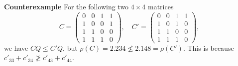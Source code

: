 \documentclass{beamer}
\theoremstyle{plain}
\theoremstyle{definition}
\begin{document}
\begin{frame}{\bf Counterexample}
For the following two $4\times 4$ matrices
$$C=\begin{pmatrix}
0 & 0 & 1 & 1\\
1 & 0 & 0 & 1\\
1 & 1 & 0 & 0\\
1 & 1 & 1 & 0
\end{pmatrix},\quad C'=\begin{pmatrix}
0 & 0 & 1 & 1\\
1 & 0 & 1 &  0\\
1 & 1 & 0 & 0\\
1 & 1 & 1 & 0
\end{pmatrix},$$ 
we have $CQ\leq C'Q$, but 
$\rho(C)=2.234\not\leq 2.148= \rho(C')$. 
This is because $c'_{33}+c'_{34}\not\geq c'_{43}+c'_{44}$. 
\end{frame}
\end{document}
